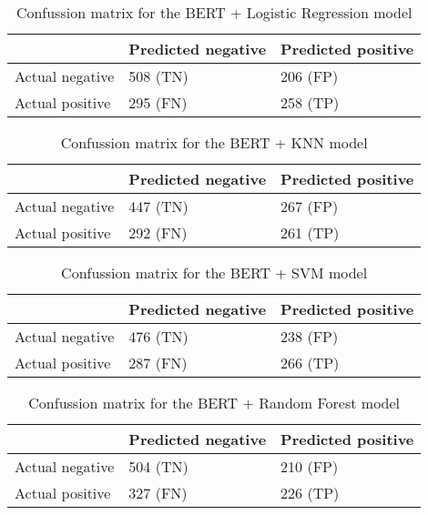 
\begin{table}[H]
\centering
{
\makegapedcells
\begin{tabular}{lll}
                & Predicted negative & Predicted positive \\
\hline
Actual negative & 508 (TN)           & 206 (FP) \\
Actual positive & 295 (FN)           & 258 (TP) \\
\hline
\end{tabular}
}
\caption{Confussion matrix for the BERT + Logistic Regression model}
\label{bertlr_cm}
\end{table}

\begin{table}[H]
\centering
{
\makegapedcells
\begin{tabular}{lll}
                & Predicted negative & Predicted positive \\
\hline
Actual negative & 447 (TN)           & 267 (FP) \\
Actual positive & 292 (FN)           & 261 (TP) \\
\hline
\end{tabular}
}
\caption{Confussion matrix for the BERT + KNN model}
\label{bertknn_cm}
\end{table}

\begin{table}[H]
\centering
{
\makegapedcells
\begin{tabular}{lll}
                & Predicted negative & Predicted positive \\
\hline
Actual negative & 476 (TN)           & 238 (FP) \\
Actual positive & 287 (FN)           & 266 (TP) \\
\hline
\end{tabular}
}
\caption{Confussion matrix for the BERT + SVM model}
\label{bertsvm_cm}
\end{table}

\begin{table}[H]
\centering
{
\makegapedcells
\begin{tabular}{lll}
                & Predicted negative & Predicted positive \\
\hline
Actual negative & 504 (TN)           & 210 (FP) \\
Actual positive & 327 (FN)           & 226 (TP) \\
\hline
\end{tabular}
}
\caption{Confussion matrix for the BERT + Random Forest model}
\label{bertrf_cm}
\end{table}


